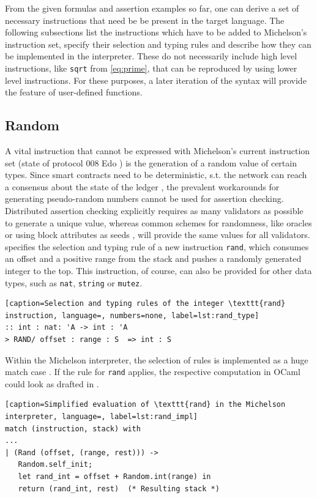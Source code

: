 From the given formulas and assertion examples so far, one can derive a set of necessary instructions that need be be present in the target language. The following subsections list the instructions which have to be added to Michelson's instruction set, specify their selection and typing rules and describe how they can be implemented in the interpreter. These do not necessarily include high level instructions, like \texttt{sqrt} from \eqref{eq:prime}, that can be reproduced by using lower level instructions. For these purposes, a later iteration of the syntax will provide the feature of user-defined functions.

\subsection{Random}
A vital instruction that cannot be expressed with Michelson's current instruction set (state of protocol 008 Edo \cite{tezos_docs}) is the generation of a random value of certain types. Since smart contracts need to be deterministic, s.t. the network can reach a consensus about the state of the ledger \cite{chatterjee_probabilistic_2019}, the prevalent workarounds for generating pseudo-random numbers cannot be used for assertion checking. Distributed assertion checking explicitly requires as many validators as possible to generate a unique value, whereas common schemes for randomness, like oracles or using block attributes as seeds \cite{chatterjee_probabilistic_2019}, will provide the same values for all validators.\\
 specifies the selection and typing rule of a new instruction \texttt{rand}, which consumes an offset and a positive range from the stack and pushes a randomly generated integer to the top. This instruction, of course, can also be provided for other data types, such as \texttt{nat}, \texttt{string} or \texttt{mutez}.
\lstset{upquote=true}
\begin{lstlisting}[caption=Selection and typing rules of the integer \texttt{rand} instruction, language=, numbers=none, label=lst:rand_type]
:: int : nat: 'A -> int : 'A
> RAND/ offset : range : S  => int : S
\end{lstlisting}

Within the Michelson interpreter, the selection of rules is implemented as a huge match case \cite{tezos_repo}. If the rule for \texttt{rand} applies, the respective computation in OCaml could look as drafted in .
\begin{lstlisting}[caption=Simplified evaluation of \texttt{rand} in the Michelson interpreter, language=, label=lst:rand_impl]
match (instruction, stack) with
...
| (Rand (offset, (range, rest))) -> 
   Random.self_init;
   let rand_int = offset + Random.int(range) in
   return (rand_int, rest)  (* Resulting stack *)
\end{lstlisting}

